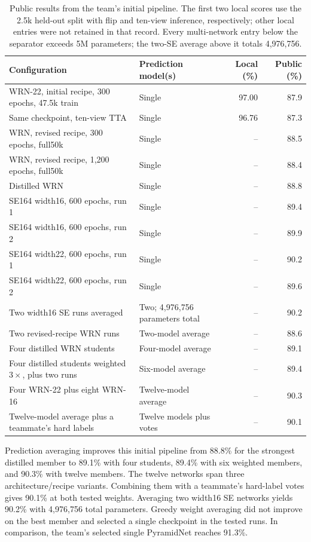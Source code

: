 \documentclass[letterpaper]{article} %
\begin{document}
\begin{table}[t]
\centering\small
\begin{tabular}{llrr}
\toprule
Configuration & Prediction model(s) & Local (\%) & Public (\%)\\
\midrule
WRN-22, initial recipe, 300 epochs, 47.5k train & Single & 97.00 & 87.9\\
Same checkpoint, ten-view TTA & Single & 96.76 & 87.3\\
WRN, revised recipe, 300 epochs, full50k & Single & -- & 88.5\\
WRN, revised recipe, 1,200 epochs, full50k & Single & -- & 88.4\\
Distilled WRN & Single & -- & 88.8\\
SE164 width16, 600 epochs, run 1 & Single & -- & 89.4\\
SE164 width16, 600 epochs, run 2 & Single & -- & 89.9\\
SE164 width22, 600 epochs, run 1 & Single & -- & 90.2\\
SE164 width22, 600 epochs, run 2 & Single & -- & 89.6\\
Two width16 SE runs averaged & Two; 4,976,756 parameters total & -- & 90.2\\
\midrule
Two revised-recipe WRN runs & Two-model average & -- & 88.6\\
Four distilled WRN students & Four-model average & -- & 89.1\\
Four distilled students weighted $3\times$, plus two runs & Six-model average & -- & 89.4\\
Four WRN-22 plus eight WRN-16 & Twelve-model average & -- & 90.3\\
Twelve-model average plus a teammate's hard labels & Twelve models plus votes & -- & 90.1\\
\bottomrule
\end{tabular}
\caption{Public results from the team's initial pipeline. The first two local scores use the 2.5k held-out split with flip and ten-view inference, respectively; other local entries were not retained in that record. Every multi-network entry below the separator exceeds 5M parameters; the two-SE average above it totals 4,976,756.}
\label{tab:team-results}
\end{table}

Prediction averaging improves this initial pipeline from 88.8\% for the strongest distilled member to 89.1\% with four students, 89.4\% with six weighted members, and 90.3\% with twelve members. The twelve networks span three architecture/recipe variants. Combining them with a teammate's hard-label votes gives 90.1\% at both tested weights. Averaging two width16 SE networks yields 90.2\% with 4,976,756 total parameters. Greedy weight averaging did not improve on the best member and selected a single checkpoint in the tested runs. In comparison, the team's selected single PyramidNet reaches 91.3\%.
\end{document}
